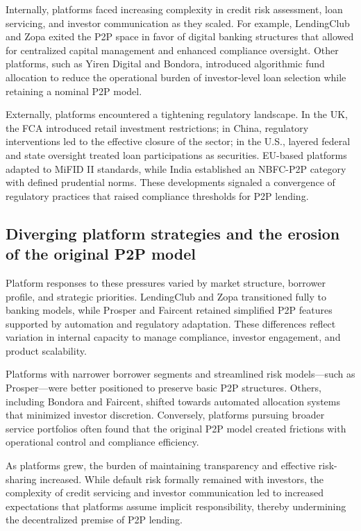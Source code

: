 \documentclass[pdflatex,sn-apa]{sn-jnl}%
\theoremstyle{thmstyleone}%
\theoremstyle{thmstyletwo}%
\theoremstyle{thmstylethree}%
\begin{document}
Internally, platforms faced increasing complexity in credit risk assessment, loan servicing, and investor communication as they scaled. For example, LendingClub and Zopa exited the P2P space in favor of digital banking structures that allowed for centralized capital management and enhanced compliance oversight. Other platforms, such as Yiren Digital and Bondora, introduced algorithmic fund allocation to reduce the operational burden of investor-level loan selection while retaining a nominal P2P model.

Externally, platforms encountered a tightening regulatory landscape. In the UK, the FCA introduced retail investment restrictions; in China, regulatory interventions led to the effective closure of the sector; in the U.S., layered federal and state oversight treated loan participations as securities. EU-based platforms adapted to MiFID II standards, while India established an NBFC-P2P category with defined prudential norms. These developments signaled a convergence of regulatory practices that raised compliance thresholds for P2P lending.

\subsection{Diverging platform strategies and the erosion of the original P2P model}
Platform responses to these pressures varied by market structure, borrower profile, and strategic priorities. LendingClub and Zopa transitioned fully to banking models, while Prosper and Faircent retained simplified P2P features supported by automation and regulatory adaptation. These differences reflect variation in internal capacity to manage compliance, investor engagement, and product scalability.

Platforms with narrower borrower segments and streamlined risk models—such as Prosper—were better positioned to preserve basic P2P structures. Others, including Bondora and Faircent, shifted towards automated allocation systems that minimized investor discretion. Conversely, platforms pursuing broader service portfolios often found that the original P2P model created frictions with operational control and compliance efficiency.

As platforms grew, the burden of maintaining transparency and effective risk-sharing increased. While default risk formally remained with investors, the complexity of credit servicing and investor communication led to increased expectations that platforms assume implicit responsibility, thereby undermining the decentralized premise of P2P lending.
\end{document}
